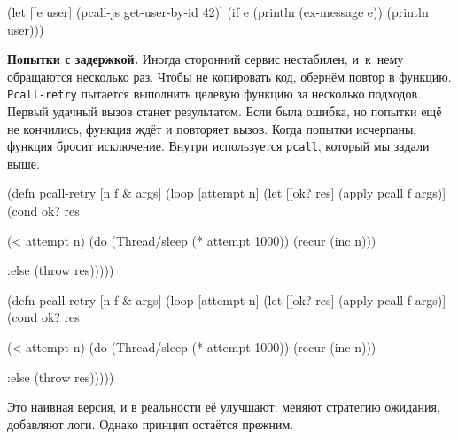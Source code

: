 \else

\begin{english}
  \begin{clojure}
(let [[e user] (pcall-js get-user-by-id 42)]
  (if e
    (println (ex-message e))
    (println user)))
  \end{clojure}
\end{english}

\fi


\textbf{Попытки с задержкой.} Иногда сторонний сервис нестабилен, и~к~нему
обращаются несколько раз. Чтобы не копировать код, обернём повтор в
функцию. \verb|Pcall-retry| пытается выполнить целевую функцию за несколько
подходов. Первый удачный вызов станет результатом. Если была ошибка, но попытки
ещё не кончились, функция ждёт и повторяет вызов. Когда попытки
исчерпаны, функция бросит исключение. Внутри используется \verb|pcall|,
который мы задали выше.


\ifx\DEVICETYPE\MOBILE

\begin{english}
  \begin{clojure}
(defn pcall-retry [n f & args]
  (loop [attempt n]
    (let [[ok? res] (apply pcall f args)]
      (cond
        ok? res

        (< attempt n)
        (do (Thread/sleep
              (* attempt 1000))
            (recur (inc n)))

        :else (throw res)))))
  \end{clojure}
\end{english}

\else

\begin{english}
  \begin{clojure}
(defn pcall-retry [n f & args]
  (loop [attempt n]
    (let [[ok? res] (apply pcall f args)]
      (cond
        ok? res

        (< attempt n)
        (do (Thread/sleep (* attempt 1000))
            (recur (inc n)))

        :else (throw res)))))
  \end{clojure}
\end{english}

\fi

Это наивная версия, и в реальности её улучшают: меняют стратегию ожидания,
добавляют логи. Однако принцип остаётся прежним.

